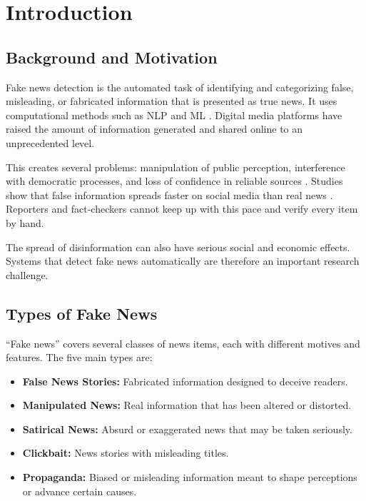 \documentclass[runningheads]{llncs}
\begin{document}
\section{Introduction}
\subsection{Background and Motivation}

Fake news detection is the automated task of identifying and categorizing false, misleading, or fabricated information that is presented as true news. It uses computational methods such as NLP and ML \cite{Shu2020FakeNewsNet,Shu2017FakeNewsDetection}. Digital media platforms have raised the amount of information generated and shared online to an unprecedented level.

This creates several problems: manipulation of public perception, interference with democratic processes, and loss of confidence in reliable sources \cite{Shu2020FakeNewsNet,Shu2017FakeNewsDetection}. Studies show that false information spreads faster on social media than real news \cite{Vosoughi2018Spread}. Reporters and fact-checkers cannot keep up with this pace and verify every item by hand.

The spread of disinformation can also have serious social and economic effects. Systems that detect fake news automatically are therefore an important research challenge.

\subsection{Types of Fake News}

``Fake news'' covers several classes of news items, each with different motives and features. The five main types are:

\begin{itemize}
\item \textbf{False News Stories:} Fabricated information designed to deceive readers.
\item \textbf{Manipulated News:} Real information that has been altered or distorted.
\item \textbf{Satirical News:} Absurd or exaggerated news that may be taken seriously.
\item \textbf{Clickbait:} News stories with misleading titles.
\item \textbf{Propaganda:} Biased or misleading information meant to shape perceptions or advance certain causes.
\end{itemize}
\end{document}
